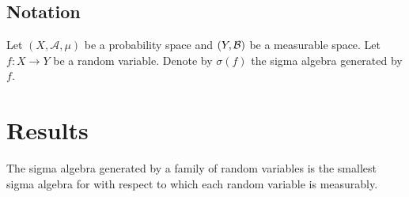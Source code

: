 \subsection*{Notation}

Let $(X, \mathcal{A} , \mu )$ be a probability space and $(Y, \mathcal{B})$ be a measurable space.
Let $f: X \to Y$ be a random variable.
Denote by $\sigma (f)$ the sigma algebra generated by $f$.

\section*{Results}

\begin{proposition}
The sigma algebra generated by a family of random variables is the smallest sigma algebra for with respect to which each random variable is measurably.
\end{proposition}
